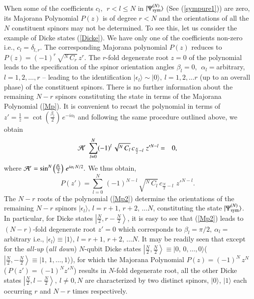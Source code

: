 {When some of the coefficients $c_l,\ \  r< l\leq N$ in $\vert \Psi^{(N)}_{\rm sym}\rangle$ (See (\ref{sympure1})) are zero, its Majorana Polynomial 
$P(z)$ is of degree $r<N$ and the orientations of all the $N$ constituent spinors may not be determined. To see this, let us consider the example of Dicke states (\ref{Dicke}). We have only one of the coefficients non-zero i.e., $c_l=\delta_{l,r}$.  The corresponding Majorana polynomial $P(z)$ reduces to  $P(z)=(-1)^r\, \sqrt{^N\, C_r}\, z^{r}$. The $r$-fold degenerate root  $z=0$ of the polynomial leads to the specification of the spinor orientation angles $\beta_l=0,\ \ \alpha_l=$arbitrary, $l=1,2,\ldots, r$ -- leading to the identification $\vert\epsilon_l\rangle\sim \vert 0\rangle,\ l=1,2,\ldots r$ (up to an overall phase) of the constituent spinors. There is no further information about the remaining $N-r$ spinors constituting the state in terms of the Majorana Polynomial (\ref{Mp}).  It is convenient to recast the  polynomial in terms of $z'=\frac{1}{z}=\cot \left(\frac{\beta_l}{2}\right)\,e^{-i\alpha_l}$ and following the same procedure outlined above, we obtain 
\begin{eqnarray}
\label{cmj03}
{\cal A'}\  \sum_{l=0}^N (-1)^l\,\sqrt{^N\, C_l}\,  c_{\frac{N}{2}-l}\,  \, z'^{N-l}&=&0,  
\end{eqnarray} 
where  ${\cal A'}=\sin^N\left(\frac{\beta_l}{2}\right)\,e^{i\alpha_l\, N/2}.$ We thus obtain, 
\begin{equation} 
\label{Mp2}
P(z')=\sum_{l=0}^N\, (-1)^{N-l}\, \sqrt{^N\, C_l}\,  c_{\frac{N}{2}-l}\,  \, z'^{N-l}.
\end{equation}
The $N-r$ roots of the  polynomial (\ref{Mp2}) determine the orientations of the remaining $N-r$ spinors $\vert\epsilon_l\rangle$, $l=r+1,\,r+2,\,\ldots N$, constituting the state $\vert \Psi^{(N)}_{\rm sym}\rangle$. In particular, for Dicke states $\left\vert \frac{N}{2},r-\frac{N}{2}\right\rangle$, it is easy to see that (\ref{Mp2}) leads to $(N-r)$-fold degenerate root $z'=0$ which corresponds to 
$\beta_l=\pi/2,\ \alpha_l=$ arbitrary i.e., $\vert \epsilon_l \rangle \equiv \vert 1 \rangle$, $l=r+1,\,r+2,\, \ldots N$. 
It may be readily seen that except for the  {\em all-up} ({\em all down}) $N$-qubit Dicke states $\left\vert \frac{N}{2}, \frac{N}{2}\right\rangle\equiv \vert 0,\,0,\ldots,0\rangle$( $\left\vert \frac{N}{2},-\frac{N}{2}\right\rangle\equiv \vert 1,\,1,\ldots,1 \rangle$), for which the Majorana Polynomial  $P(z)=(-1)^N\, z^N$ ($\ P(z')=(-1)^N z'^{N}$) results in $N$-fold degenerate root,  
 all the other  Dicke states $\left\vert \frac{N}{2},l-\frac{N}{2}\right\rangle,\ l\neq 0, N$ are characterized by two distinct spinors, $\vert 0\rangle$, $\vert 1 \rangle$ each occurring $r$ and $N-r$ times respectively. 

}
